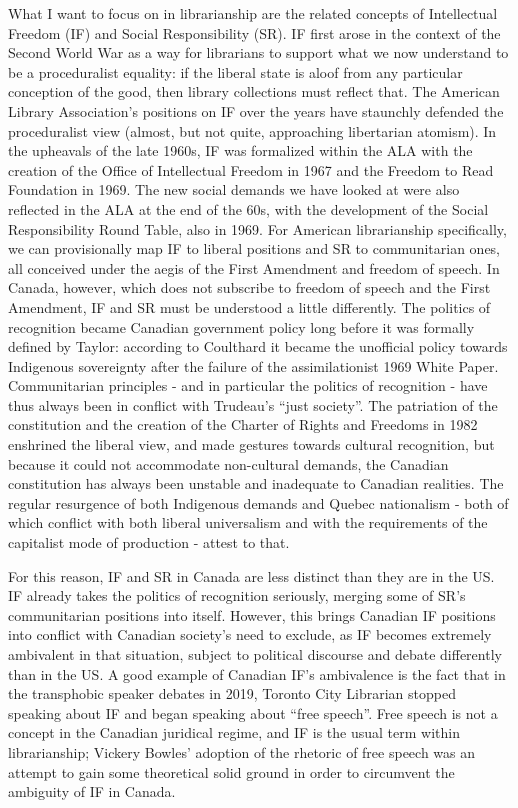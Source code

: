 \documentclass[12pt,oneside]{memoir}
\begin{document}
What I want to focus on in librarianship are the related concepts of Intellectual Freedom (IF) and Social Responsibility (SR).  IF first arose in the context of the Second World War as a way for librarians to support what we now understand to be a proceduralist equality: if the liberal state is aloof from any particular conception of the good, then library collections must reflect that. The American Library Association's positions on IF over the years have staunchly defended the proceduralist view (almost, but not quite, approaching libertarian atomism). In the upheavals of the late 1960s, IF was formalized within the ALA with the creation of the Office of Intellectual Freedom in 1967 and the Freedom to Read Foundation in 1969. The new social demands we have looked at were also reflected in the ALA at the end of the 60s, with the development of the Social Responsibility Round Table, also in 1969. For American librarianship specifically, we can provisionally map IF to liberal positions and SR to communitarian ones, all conceived under the aegis of the First Amendment and freedom of speech.
In Canada, however, which does not subscribe to freedom of speech and the First Amendment, IF and SR must be understood a little differently. The politics of recognition became Canadian government policy long before it was formally defined by Taylor: according to Coulthard it became the unofficial policy towards Indigenous sovereignty after the failure of the assimilationist 1969 White Paper. Communitarian principles - and in particular the politics of recognition - have thus always been in conflict with Trudeau's ``just society''. The patriation of the constitution and the creation of the Charter of Rights and Freedoms in 1982 enshrined the liberal view, and made gestures towards cultural recognition, but because it could not accommodate non-cultural demands, the Canadian constitution has always been unstable and inadequate to Canadian realities. The regular resurgence of both Indigenous demands and Quebec nationalism - both of which conflict with both liberal universalism and with the requirements of the capitalist mode of production - attest to that.

For this reason, IF and SR in Canada are less distinct than they are in the US. IF already takes the politics of recognition seriously, merging some of SR's communitarian positions into itself. However, this brings Canadian IF positions into conflict with Canadian society's need to exclude, as IF becomes extremely ambivalent in that situation, subject to political discourse and debate differently than in the US. A good example of Canadian IF's ambivalence is the fact that in the transphobic speaker debates in 2019, Toronto City Librarian stopped speaking about IF and began speaking about ``free speech''. Free speech is not a concept in the Canadian juridical regime, and IF is the usual term within librarianship; Vickery Bowles' adoption of the rhetoric of free speech was an attempt to gain some theoretical solid ground in order to circumvent the ambiguity of IF in Canada.
\end{document}
